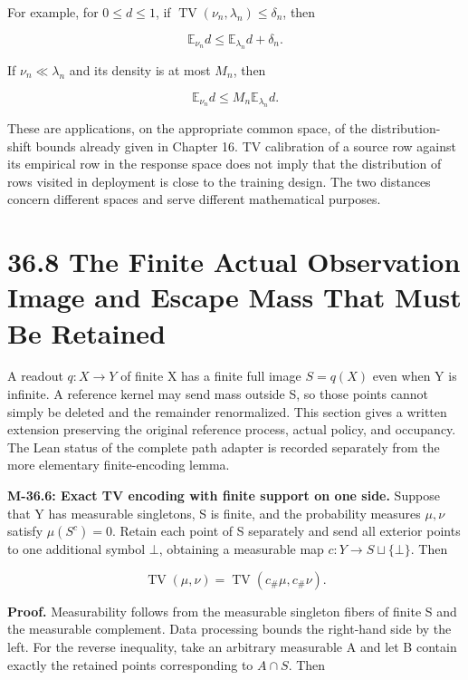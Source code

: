 \documentclass[
  english,
  11pt,
  oneside]{book}
\begin{document}
For example, for \(0\le d\le1\), if \(\operatorname{TV}(\nu_n,\lambda_n)\le\delta_n\), then

\[\mathbb E_{\nu_n}d\le\mathbb E_{\lambda_n}d+\delta_n.\]

If \(\nu_n\ll\lambda_n\) and its density is at most \(M_n\), then

\[\mathbb E_{\nu_n}d\le M_n\mathbb E_{\lambda_n}d.\]

These are applications, on the appropriate common space, of the distribution-shift bounds already given in Chapter 16. TV calibration of a source row against its empirical row in the response space does not imply that the distribution of rows visited in deployment is close to the training design. The two distances concern different spaces and serve different mathematical purposes.

\section{36.8 The Finite Actual Observation Image and Escape Mass That Must Be Retained}\label{the-finite-actual-observation-image-and-escape-mass-that-must-be-retained}

A readout \(q:X\to Y\) of finite X has a finite full image \(S=q(X)\) even when Y is infinite. A reference kernel may send mass outside S, so those points cannot simply be deleted and the remainder renormalized. This section gives a written extension preserving the original reference process, actual policy, and occupancy. The Lean status of the complete path adapter is recorded separately from the more elementary finite-encoding lemma.

\hypertarget{m-36-6}{}\label{m-36-6}

\textbf{M-36.6: Exact TV encoding with finite support on one side.} Suppose that Y has measurable singletons, S is finite, and the probability measures \(\mu,\nu\) satisfy \(\mu(S^c)=0\). Retain each point of S separately and send all exterior points to one additional symbol \(\bot\), obtaining a measurable map \(c:Y\to S\sqcup\{\bot\}\). Then

\[\operatorname{TV}(\mu,\nu)=\operatorname{TV}(c_\#\mu,c_\#\nu).\]

\textbf{Proof.} Measurability follows from the measurable singleton fibers of finite S and the measurable complement. Data processing bounds the right-hand side by the left. For the reverse inequality, take an arbitrary measurable A and let B contain exactly the retained points corresponding to \(A\cap S\). Then
\end{document}
